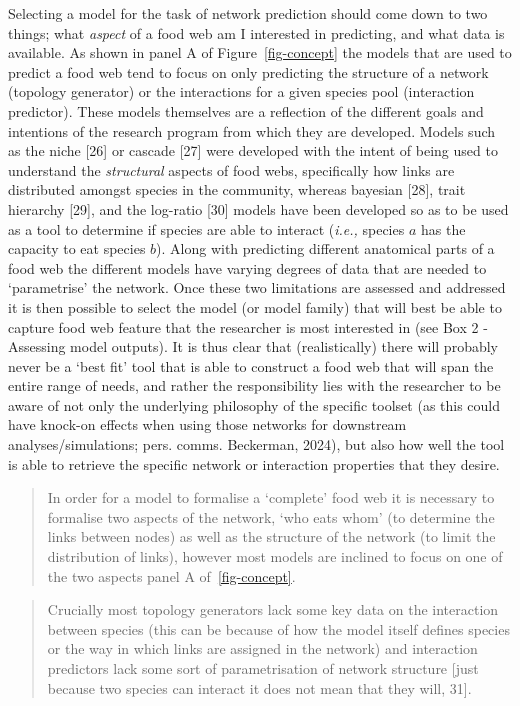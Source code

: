 \documentclass[
]{article}
\begin{document}
Selecting a model for the task of network prediction should come down to
two things; what \emph{aspect} of a food web am I interested in
predicting, and what data is available. As shown in panel A of
Figure~\ref{fig-concept} the models that are used to predict a food web
tend to focus on only predicting the structure of a network (topology
generator) or the interactions for a given species pool (interaction
predictor). These models themselves are a reflection of the different
goals and intentions of the research program from which they are
developed. Models such as the niche {[}26{]} or cascade {[}27{]} were
developed with the intent of being used to understand the
\emph{structural} aspects of food webs, specifically how links are
distributed amongst species in the community, whereas bayesian {[}28{]},
trait hierarchy {[}29{]}, and the log-ratio {[}30{]} models have been
developed so as to be used as a tool to determine if species are able to
interact (\emph{i.e.,} species \(a\) has the capacity to eat species
\(b\)). Along with predicting different anatomical parts of a food web
the different models have varying degrees of data that are needed to
`parametrise' the network. Once these two limitations are assessed and
addressed it is then possible to select the model (or model family) that
will best be able to capture food web feature that the researcher is
most interested in (see Box 2 - Assessing model outputs). It is thus
clear that (realistically) there will probably never be a `best fit'
tool that is able to construct a food web that will span the entire
range of needs, and rather the responsibility lies with the researcher
to be aware of not only the underlying philosophy of the specific
toolset (as this could have knock-on effects when using those networks
for downstream analyses/simulations; pers. comms. Beckerman, 2024), but
also how well the tool is able to retrieve the specific network or
interaction properties that they desire.

\begin{quote}
In order for a model to formalise a `complete' food web it is necessary
to formalise two aspects of the network, `who eats whom' (to determine
the links between nodes) as well as the structure of the network (to
limit the distribution of links), however most models are inclined to
focus on one of the two aspects panel A of~\ref{fig-concept}.
\end{quote}

\begin{quote}
Crucially most topology generators lack some key data on the interaction
between species (this can be because of how the model itself defines
species or the way in which links are assigned in the network) and
interaction predictors lack some sort of parametrisation of network
structure {[}just because two species can interact it does not mean that
they will, 31{]}.
\end{quote}
\end{document}
